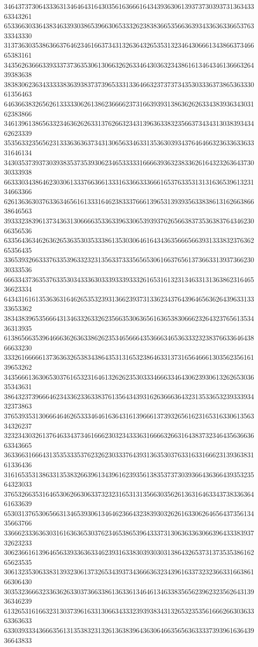 34643737306433363134646431643035616366616434393630613937373039373136343363343261
65336630336438346339303865396630653332623838366535663639343363633665376333343330
31373630353863663764623461663734313263643265353132346430666134386637346665383161
34356263666339333737363530613066326263346430363234386161346434613666326439383638
38383062363433333836393837373965333133646632373737343530333637386536333061356463
64636638326562613333306261386236666237316639393138636262633438393634303162383866
34613961386563323463626263313762663234313963633832356637343431303839343462623339
35356332356562313336363637343130656334633135363039343764646632363363363331646134
34303537393730393835373539306234653333316666393632383362616432326364373030333938
66333034386462303061333766366133316336633366616537633531313163653961323134663366
62613636303763363465616133316462383337666139653139393563383861316266386638646563
39333238396137343631306666353363396330653939376265663837353638376434623066356536
63356436346263626536353035333861353030646164343635666566393133383237636265356435
33653932663337633539633232313563373335656530616637656137366331393736623030333536
66633437363537633530343336303339333933326165316132313463313136386231646536623334
64343161613536363164626535323931366239373133623437643964656362643963313333653362
38343839653566643134633263326235663530636561636538306662326432376561353436313935
61386566353964666362636338626235346566643536663465363332323837663364643866633230
33326166666137363632653834386435313165323864633137316564666130356235616139653262
34356661363065303761653231646132626235303334666334643062393061326265303635343631
38643237396664623433623363383761356434393162636663643231353365323933393432373863
37653935313066646462653334646163643161396661373932656162316531633061356334326237
32323430326137646334373461666230323433363166663266316438373234643563663663343665
36336631666431353533353762326230333764393136353037633163316662313936383161336436
31616535313863313538326639613439616239356138353737303936643636643935323564323033
37653266353164653062663063373232316531313566303562613631646334373833636461633639
65303137653065663134653930613464623664323839303262616330626465643735613435663766
33666233363630316163636530376234653865396433373130636336306639643338393732623233
30623661613964656339336363346239316338303930303138643265373137353538616265623535
30613235306338313932306137326534393734366636323439616337323236633166386166306430
30353236663233636263303736633861363361346461346338356562396232356264313936346239
61326531616632313037396163313066343332393938343132653235356166626630363363363633
63303933343666356131353832313261363839643630646635656363333739396163643936643833
